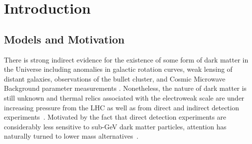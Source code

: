 \onehalfspacing
\justify
\setlength{\parindent}{2em}
\chapter{Introduction}\label{chap:intro}

\section{Models and Motivation}\label{sec:models}

There is strong indirect evidence for the existence of some form of dark matter in the Universe including anomalies in galactic rotation curves, weak lensing of distant galaxies, observations of the bullet cluster, and Cosmic Microwave Background parameter measurements \cite{Bertone:2004pz, Cirelli:2012tf, Gaskins:2016cha, Slatyer:2017sev}. Nonetheless, the nature of dark matter is still unknown and thermal relics associated with the electroweak scale are under increasing pressure from the LHC as well as from direct and indirect detection experiments~\cite{Aaboud:2017phn,Sirunyan:2018xlo,Aprile:2018dbl,Akerib:2016vxi,Cui:2017nnn,TheFermi-LAT:2017vmf,Aghanim:2018eyx,Escudero:2016gzx,Arcadi:2017kky,Roszkowski:2017nbc,Athron:2017kgt,Arcadi:2019lka,Blanco:2019hah}. Motivated by the fact that direct detection experiments are considerably less sensitive to sub-GeV dark matter particles, attention has naturally turned to lower mass alternatives~\cite{Essig:2013lka,Alexander:2016aln,Battaglieri:2017aum,Beacham:2019nyx}.

